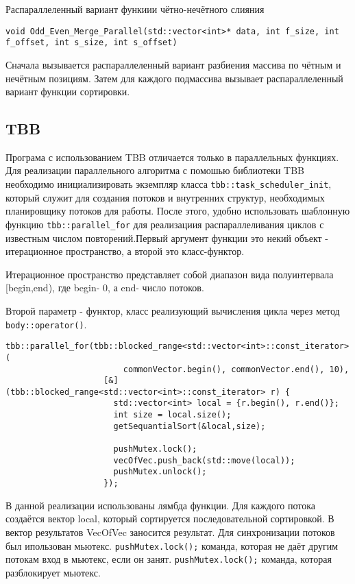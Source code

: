 \documentclass{report}
\begin{document}
\par Распараллеленный вариант функиии чётно-нечётного слияния \par
\begin{lstlisting}
void Odd_Even_Merge_Parallel(std::vector<int>* data, int f_size, int f_offset, int s_size, int s_offset)
\end{lstlisting}

\par Сначала вызывается распараллеленный вариант разбиения массива по чётным и нечётным позициям. Затем для каждого подмассива вызывает распараллеленный вариант функции сортировки. \par


\subsection*{TBB}
\par Програма с использованием TBB отличается только в параллельных функциях. Для реализации параллельного алгоритма с помошью библиотеки TBB необходимо инициализировать экземпляр класса \verb|tbb::task_scheduler_init|, который служит для создания потоков и внутренних структур, необходимых планировщику потоков для работы. После этого, удобно использовать шаблонную функцию \verb|tbb::parallel_for| для реализациия распараллеливания циклов с известным числом повторений.Первый аргумент функции это некий объект - итерационное пространство, а второй это класс-функтор.
\par Итерационное пространство представляет собой диапазон вида полуинтервала [begin,end), где begin- 0, а end- число потоков.
\par Второй параметр - функтор, класс реализующий вычисления цикла через метод \verb|body::operator()|.
\par

\begin{lstlisting}
tbb::parallel_for(tbb::blocked_range<std::vector<int>::const_iterator>(
                        commonVector.begin(), commonVector.end(), 10),
                    [&](tbb::blocked_range<std::vector<int>::const_iterator> r) {
                      std::vector<int> local = {r.begin(), r.end()};
                      int size = local.size();
                      getSequantialSort(&local,size);

                      pushMutex.lock();
                      vecOfVec.push_back(std::move(local));
                      pushMutex.unlock();
                    });
\end{lstlisting}
\par В данной реализации использованы лямбда функции. Для каждого потока создаётся вектор local, который сортируется последовательной сортировкой. В вектор результатов VecOfVec заносится результат. Для синхронизации потоков был ипользован мьютекс. \verb|pushMutex.lock();| команда, которая не даёт другим потокам вход в мьютекс, если он занят. \verb|pushMutex.lock();| команда, которая разблокирует мьютекс.
\end{document}
